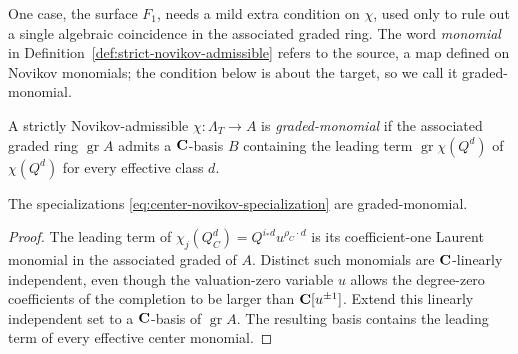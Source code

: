 One case, the surface \(F_1\), needs a mild extra condition on \(\chi\), used
only to rule out a single algebraic coincidence in the associated graded ring.
The word \emph{monomial} in Definition~\ref{def:strict-novikov-admissible} refers
to the source, a map defined on Novikov monomials; the condition below is about
the target, so we call it graded-monomial.

\begin{definition}
\label{def:monomial-specialization}
%
%
A strictly Novikov-admissible \(\chi:\Lambda_T\to A\) is \emph{graded-monomial} if the
associated graded ring \(\operatorname{gr}A\) admits a \(\mathbf C\)-basis \(B\)
containing the leading term \(\operatorname{gr}\chi(Q^d)\) of \(\chi(Q^d)\) for
every effective class \(d\).
\end{definition}

\begin{lemma}
\label{lem:center-maps-monomial}
%
%
The specializations \eqref{eq:center-novikov-specialization} are graded-monomial.
\end{lemma}

\begin{proof}
The leading term of
\(\chi_j(Q_C^d)=Q^{i_*d}u^{\rho_C\cdot d}\) is its coefficient-one Laurent
monomial in the associated graded of \(A\).  Distinct such monomials are
\(\mathbf C\)-linearly independent, even though the valuation-zero variable \(u\)
allows the degree-zero coefficients of the completion to be larger than
\(\mathbf C[u^{\pm1}]\).  Extend this linearly independent set to a
\(\mathbf C\)-basis of \(\operatorname{gr}A\).  The resulting basis contains the
leading term of every effective center monomial.
\end{proof}

